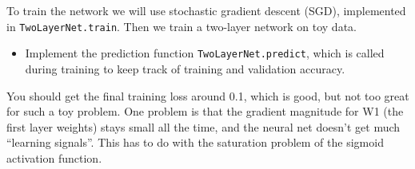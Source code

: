 \documentclass[11pt]{article}
\providecommand{\tightlist}{%
      \setlength{\itemsep}{0pt}\setlength{\parskip}{0pt}}
\begin{document}
To train the network we will use stochastic gradient descent (SGD),
implemented in \texttt{TwoLayerNet.train}. Then we train a two-layer
network on toy data.

\begin{itemize}
\tightlist
\item
  Implement the prediction function \texttt{TwoLayerNet.predict}, which
  is called during training to keep track of training and validation
  accuracy.
\end{itemize}

You should get the final training loss around 0.1, which is good, but
not too great for such a toy problem. One problem is that the gradient
magnitude for W1 (the first layer weights) stays small all the time, and
the neural net doesn't get much ``learning signals''. This has to do
with the saturation problem of the sigmoid activation function.
\end{document}
